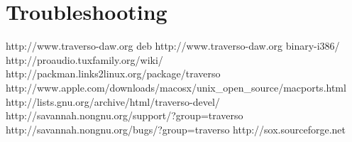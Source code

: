 \documentclass[a4paper,
               12pt,
               pdftex,
               twoside,
               smallheadings,
               headsepline,
               headinclude,
               DIV16,
               BCOR10mm
               ]{scrreprt}
\begin{document}
\chapter{Troubleshooting}


\begin{thebibliography}{xx}
   http://www.traverso-daw.org
   deb http://www.traverso-daw.org binary-i386/
   http://proaudio.tuxfamily.org/wiki/
   http://packman.links2linux.org/package/traverso
   http://www.apple.com/downloads/macosx/unix\_open\_source/macports.html
   http://lists.gnu.org/archive/html/traverso-devel/
   http://savannah.nongnu.org/support/?group=traverso
   http://savannah.nongnu.org/bugs/?group=traverso
   http://sox.sourceforge.net
\end{thebibliography}
\end{document}
